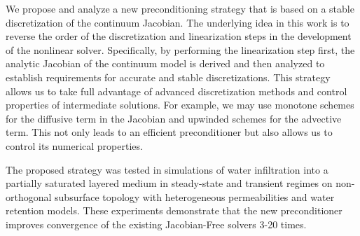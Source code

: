 \documentclass{report}
\begin{document}
We propose and analyze a new preconditioning strategy that is based on a
stable discretization
of the continuum Jacobian. The underlying idea in this work is to reverse
the order of the
discretization and linearization steps in the development of the
nonlinear solver. Specifically, by performing the linearization step
first, the analytic Jacobian of the continuum model is derived and
then analyzed to establish requirements for accurate and stable
discretizations.
This strategy allows us to take full
advantage of advanced discretization methods and control properties of
intermediate solutions.
For example, we may use monotone schemes for the diffusive term in the Jacobian and
upwinded schemes for the advective term. This not only leads to an efficient
preconditioner but also allows us to control its numerical properties.

The proposed strategy was tested in simulations of water infiltration into a partially
saturated layered medium in
steady-state and transient regimes on
non-orthogonal subsurface topology with
heterogeneous permeabilities and water retention models.
These experiments demonstrate that the new preconditioner improves
convergence of the existing
Jacobian-Free solvers 3-20 times.
\end{document}
